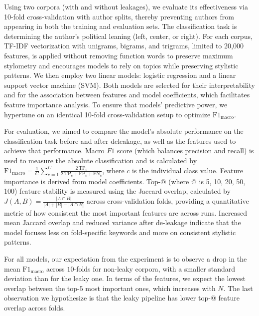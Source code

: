 \documentclass[11pt]{article}
\begin{document}
Using two corpora (with and without leakages), we evaluate its effectiveness via 10-fold cross-validation with author splits, thereby preventing authors from appearing in both the training and evaluation sets. The classification task is determining the author’s political leaning (left, center, or right). For each corpus, TF-IDF vectorization with unigrams, bigrams, and trigrams, limited to 20,000 features, is applied without removing function words to preserve maximum stylometry and encourages models to rely on topics while preserving stylistic patterns. We then employ two linear models: logistic regression and a linear support vector machine (SVM). Both models are selected for their interpretability and for the association between features and model coefficients, which facilitates feature importance analysis. To ensure that models’ predictive power, we hypertune on an identical 10-fold cross-validation setup to optimize $\mathrm{F1}_{\text{macro}}$.

For evaluation, we aimed to compare the model's absolute performance on the classification task before and after deleakage, as well as the features used to achieve that performance. Macro $F1$ score (which balances precision and recall) is used to measure the absolute classification and is calculated by
$\mathrm{F1}_{\text{macro}}=\frac{1}{C}\sum_{c=1}^{C}\frac{2\,\mathrm{TP}_c}{2\,\mathrm{TP}_c+\mathrm{FP}_c+\mathrm{FN}_c}$,
where $c$ is the individual class value. Feature importance is derived from model coefficients. Top-$@$ (where $@$ is 5, 10, 20, 50, 100) feature stability is measured using the Jaccard overlap, calculated by
$J(A,B)=\frac{|A\cap B|}{|A|+|B|-|A\cap B|}$
across cross-validation folds, providing a quantitative metric of how consistent the most important features are across runs. Increased mean Jaccard overlap and reduced variance after de-leakage indicate that the model focuses less on fold-specific keywords and more on consistent stylistic patterns.

For all models, our expectation from the experiment is to observe a drop in the mean $\mathrm{F1}_{\text{macro}}$ across $10$-folds for non-leaky corpora, with a smaller standard deviation than for the leaky one. In terms of the features, we expect the lowest overlap between the top-$5$ most important ones, which increases with $N$. The last observation we hypothesize is that the leaky pipeline has lower top-$@$ feature overlap across folds.
\end{document}
